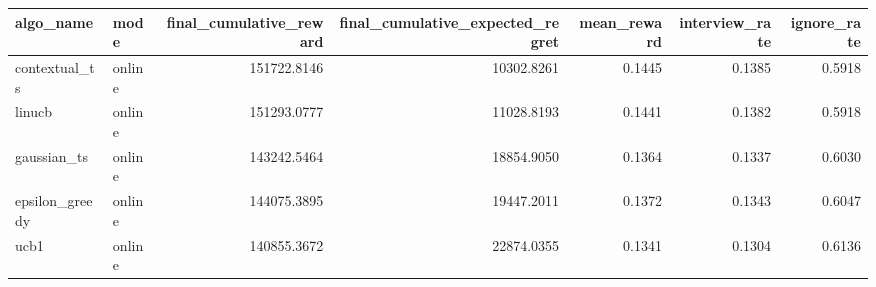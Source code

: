 \begin{tabular}{llrrrrr}
\toprule
algo_name & mode & final_cumulative_reward & final_cumulative_expected_regret & mean_reward & interview_rate & ignore_rate \\
\midrule
contextual_ts & online & 151722.8146 & 10302.8261 & 0.1445 & 0.1385 & 0.5918 \\
linucb & online & 151293.0777 & 11028.8193 & 0.1441 & 0.1382 & 0.5918 \\
gaussian_ts & online & 143242.5464 & 18854.9050 & 0.1364 & 0.1337 & 0.6030 \\
epsilon_greedy & online & 144075.3895 & 19447.2011 & 0.1372 & 0.1343 & 0.6047 \\
ucb1 & online & 140855.3672 & 22874.0355 & 0.1341 & 0.1304 & 0.6136 \\
\bottomrule
\end{tabular}
